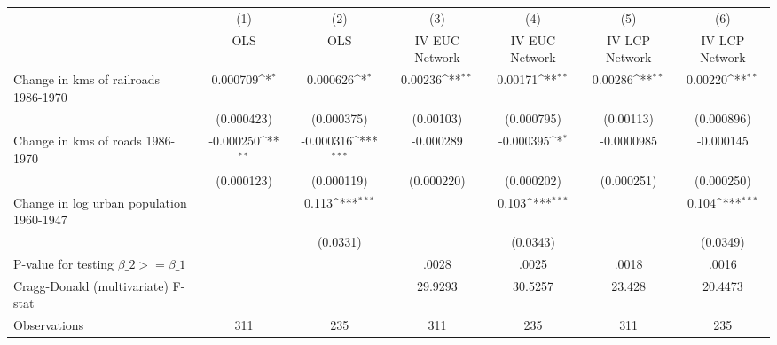 {
\def\sym#1{\ifmmode^{#1}\else\(^{#1}\)\fi}
\begin{tabular}{l*{6}{c}}
\hline\hline
                &\multicolumn{1}{c}{(1)}&\multicolumn{1}{c}{(2)}&\multicolumn{1}{c}{(3)}&\multicolumn{1}{c}{(4)}&\multicolumn{1}{c}{(5)}&\multicolumn{1}{c}{(6)}\\
                &\multicolumn{1}{c}{OLS}&\multicolumn{1}{c}{OLS}&\multicolumn{1}{c}{IV EUC Network}&\multicolumn{1}{c}{IV EUC Network}&\multicolumn{1}{c}{IV LCP Network}&\multicolumn{1}{c}{IV LCP Network}\\
\hline
Change in kms of railroads 1986-1970& 0.000709\sym{*}  & 0.000626\sym{*}  &  0.00236\sym{**} &  0.00171\sym{**} &  0.00286\sym{**} &  0.00220\sym{**} \\
                &(0.000423)         &(0.000375)         &(0.00103)         &(0.000795)         &(0.00113)         &(0.000896)         \\
[1em]
Change in kms of roads 1986-1970&-0.000250\sym{**} &-0.000316\sym{***}&-0.000289         &-0.000395\sym{*}  &-0.0000985         &-0.000145         \\
                &(0.000123)         &(0.000119)         &(0.000220)         &(0.000202)         &(0.000251)         &(0.000250)         \\
[1em]
Change in log urban population 1960-1947&                  &    0.113\sym{***}&                  &    0.103\sym{***}&                  &    0.104\sym{***}\\
                &                  & (0.0331)         &                  & (0.0343)         &                  & (0.0349)         \\
\hline
P-value for testing $\beta\_{2} >= \beta\_{1}$&                  &                  &    .0028         &    .0025         &    .0018         &    .0016         \\
Cragg-Donald (multivariate) F-stat&                  &                  &  29.9293         &  30.5257         &   23.428         &  20.4473         \\
Observations    &      311         &      235         &      311         &      235         &      311         &      235         \\
\hline\hline
\end{tabular}
}
